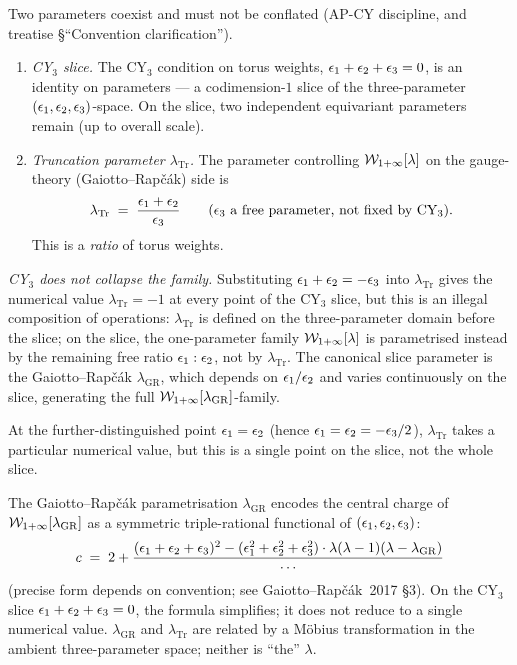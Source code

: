 \begin{remark}
\label{w17:rem:lambda-tr-vs-cy3}
Two parameters coexist and must not be conflated (AP-CY discipline, and
treatise \S``Convention clarification'').
\begin{enumerate}
\item \emph{CY$_3$ slice.} The CY$_3$ condition on torus weights,
$\epsilon_1 + \epsilon_2 + \epsilon_3 = 0$, is an identity on parameters --- a codimension-$1$
slice of the three-parameter $(\epsilon_1, \epsilon_2, \epsilon_3)$-space. On the slice, two
independent equivariant parameters remain (up to overall scale).
\item \emph{Truncation parameter $\lambda_{\mathrm{Tr}}$.} The parameter
controlling $\mathcal{W}_{1+\infty}[\lambda]$ on the gauge-theory (Gaiotto--Rap\v c\'ak) side is
\[
 \lambda_{\mathrm{Tr}} \;=\; \frac{\epsilon_1 + \epsilon_2}{\epsilon_3}
 \qquad (\epsilon_3\text{ a free parameter, not fixed by CY$_3$}).
\]
This is a \emph{ratio} of torus weights.
\end{enumerate}

\emph{CY$_3$ does not collapse the family.} Substituting
$\epsilon_1 + \epsilon_2 = -\epsilon_3$ into $\lambda_{\mathrm{Tr}}$ gives the numerical value
$\lambda_{\mathrm{Tr}} = -1$ at every point of the CY$_3$ slice, but this is an
illegal composition of operations: $\lambda_{\mathrm{Tr}}$ is defined on the
three-parameter domain before the slice; on the slice, the one-parameter family
$\mathcal{W}_{1+\infty}[\lambda]$ is parametrised instead by the remaining free ratio
$\epsilon_1 : \epsilon_2$, not by $\lambda_{\mathrm{Tr}}$. The canonical slice parameter
is the Gaiotto--Rap\v c\'ak $\lambda_{\mathrm{GR}}$, which depends on
$\epsilon_1/\epsilon_2$ and varies continuously on the slice, generating the full
$\mathcal{W}_{1+\infty}[\lambda_{\mathrm{GR}}]$-family.

At the further-distinguished point $\epsilon_1 = \epsilon_2$ (hence
$\epsilon_1 = \epsilon_2 = -\epsilon_3/2$), $\lambda_{\mathrm{Tr}}$ takes a particular
numerical value, but this is a single point on the slice, not the whole slice.
\end{remark}

\begin{remark}
\label{w17:rem:gr-parametrisation}
The Gaiotto--Rap\v c\'ak parametrisation $\lambda_{\mathrm{GR}}$ encodes the
central charge of $\mathcal{W}_{1+\infty}[\lambda_{\mathrm{GR}}]$ as a symmetric triple-rational
functional of $(\epsilon_1, \epsilon_2, \epsilon_3)$:
\[
 c \;=\; 2 + \frac{(\epsilon_1 + \epsilon_2 + \epsilon_3)^2 - (\epsilon_1^2 + \epsilon_2^2 + \epsilon_3^2)
 \cdot \lambda(\lambda - 1)(\lambda - \lambda_{\mathrm{GR}})}{\cdots}
\]
(precise form depends on convention; see Gaiotto--Rap\v c\'ak~2017 \S3). On the
CY$_3$ slice $\epsilon_1 + \epsilon_2 + \epsilon_3 = 0$, the formula simplifies; it does not
reduce to a single numerical value. $\lambda_{\mathrm{GR}}$ and $\lambda_{\mathrm{Tr}}$
are related by a M\"obius transformation in the ambient three-parameter space;
neither is ``the'' $\lambda$.
\end{remark}


